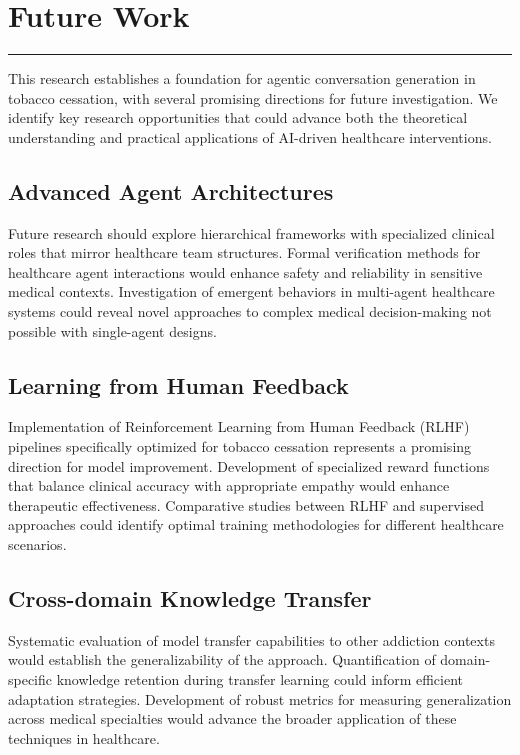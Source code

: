 \chapter{Future Work}
\label{Chapter8}

\begin{center}
\rule{0.5\textwidth}{0.5pt}
\end{center}

This research establishes a foundation for agentic conversation generation in tobacco cessation, with several promising directions for future investigation. We identify key research opportunities that could advance both the theoretical understanding and practical applications of AI-driven healthcare interventions.

\section{Advanced Agent Architectures}

Future research should explore hierarchical frameworks with specialized clinical roles that mirror healthcare team structures. Formal verification methods for healthcare agent interactions would enhance safety and reliability in sensitive medical contexts. Investigation of emergent behaviors in multi-agent healthcare systems could reveal novel approaches to complex medical decision-making not possible with single-agent designs.

\section{Learning from Human Feedback}

Implementation of Reinforcement Learning from Human Feedback (RLHF) pipelines specifically optimized for tobacco cessation represents a promising direction for model improvement. Development of specialized reward functions that balance clinical accuracy with appropriate empathy would enhance therapeutic effectiveness. Comparative studies between RLHF and supervised approaches could identify optimal training methodologies for different healthcare scenarios.

\section{Cross-domain Knowledge Transfer}

Systematic evaluation of model transfer capabilities to other addiction contexts would establish the generalizability of the approach. Quantification of domain-specific knowledge retention during transfer learning could inform efficient adaptation strategies. Development of robust metrics for measuring generalization across medical specialties would advance the broader application of these techniques in healthcare.

